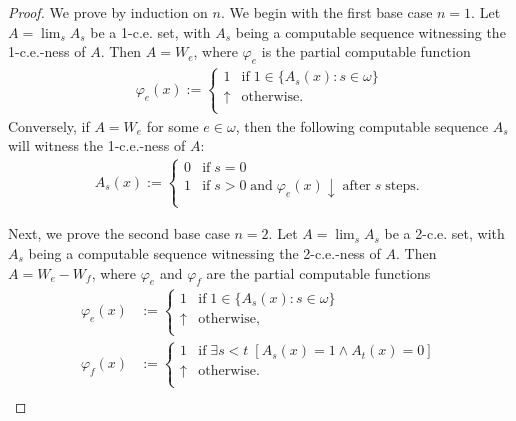 \documentclass{article}
\begin{document}
\begin{enumerate}[label={\bf Q\arabic*:}]
    \begin{proof}
      We prove by induction on $n$. We begin with the first base case
      $n=1$. Let $A=\lim_s A_s$ be a 1-c.e. set, with $A_s$ being a
      computable sequence witnessing the 1-c.e.-ness of $A$. Then $A=W_e$,
      where $\varphi_e$ is the partial computable function
      \begin{align*}
        \varphi_e(x) :=
        \begin{cases}
          1 &\text{if}\; 1\in\{A_s(x):s\in\omega\}\\
          \uparrow &\text{otherwise}.\\
        \end{cases}
      \end{align*}
      Conversely, if $A=W_e$ for some $e\in\omega$, then the following
      computable sequence $A_s$ will witness the 1-c.e.-ness of $A$:
      \begin{align*}
        A_s(x) :=
        \begin{cases}
          0 &\text{if}\; s=0\\
          1 &\text{if}\; s>0\; \text{and}\; \varphi_e(x)\downarrow\;
          \text{after}\; s\; \text{steps}.\\
        \end{cases}
      \end{align*}

      Next, we prove the second base case $n=2$. Let $A=\lim_s A_s$ be a
      2-c.e. set, with $A_s$ being a computable sequence witnessing the
      2-c.e.-ness of $A$. Then $A=W_e-W_f$, where $\varphi_e$ and
      $\varphi_f$ are the partial computable functions
      \begin{align*}
        \varphi_e(x) &:=
        \begin{cases}
          1 &\text{if}\; 1\in\{A_s(x):s\in\omega\}\\
          \uparrow &\text{otherwise},\\
        \end{cases}\\
        \varphi_f(x) &:=
        \begin{cases}
          1 &\text{if}\; \exists s<t\; \left[A_s(x)=1\wedge
            A_t(x)=0\right]\\
          \uparrow &\text{otherwise}.\\
        \end{cases}\\
      \end{align*}


\end{proof}
\end{enumerate}
\end{document}
